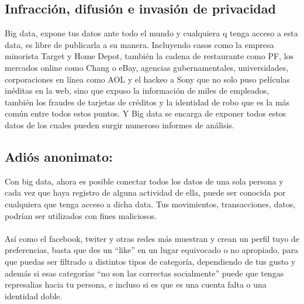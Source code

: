 \documentclass[journal]{IEEEtran}
\begin{document}
\subsection{Infracción, difusión e invasión de privacidad}
Big data, expone tus datos ante todo el mundo y cualquiera q tenga acceso a esta data, es libre de publicarla a su manera. Incluyendo casos como la empresa minorista Target y Home Depot, también la cadena de restaurante como PF, los mercados online como Chang o eBay, agencias gubernamentales, universidades, corporaciones en línea como AOL y el hackeo a Sony que no solo puso películas inéditas en la web, sino que expuso la información de miles de empleados, también los fraudes de tarjetas de créditos y la identidad de robo que es la más común entre todos estos puntos. Y Big data se encarga de exponer todos estos datos de los cuales pueden surgir numeroso informes de análisis.

\subsection{Adiós anonimato:}
Con big data, ahora es posible conectar todos los datos de una sola persona y cada vez que haya registro de alguna actividad de ella, puede ser conocida por cualquiera que tenga acceso a dicha data. Tus movimientos, transacciones, datos, podrían ser utilizados con fines maliciosos.\\ \\
Así como el facebook, twiter y otras redes más muestran y crean un perfil tuyo de preferencias, basta que des un “like” en un lugar equivocado o no apropiado, para que puedas ser filtrado a distintos tipos de categoría, dependiendo de tus gusto y además si esas categorías “no son las correctas socialmente” puede que tengas represalias hacia tu persona, e incluso si es que es una cuenta falta o una identidad doble.
\end{document}
